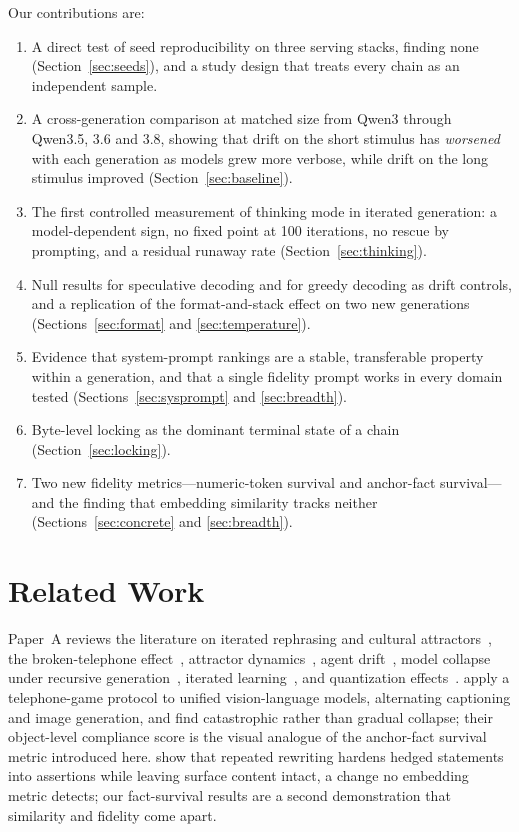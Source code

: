 \documentclass[11pt]{article}
\begin{document}
Our contributions are:
\begin{enumerate}[leftmargin=*]
  \item A direct test of seed reproducibility on three serving stacks,
        finding none (Section~\ref{sec:seeds}), and a study design that
        treats every chain as an independent sample.
  \item A cross-generation comparison at matched size from Qwen3 through
        Qwen3.5, 3.6 and 3.8, showing that drift on the short stimulus has
        \emph{worsened} with each generation as models grew more verbose,
        while drift on the long stimulus improved (Section~\ref{sec:baseline}).
  \item The first controlled measurement of thinking mode in iterated
        generation: a model-dependent sign, no fixed point at 100
        iterations, no rescue by prompting, and a residual runaway rate
        (Section~\ref{sec:thinking}).
  \item Null results for speculative decoding and for greedy decoding as
        drift controls, and a replication of the format-and-stack effect on
        two new generations (Sections~\ref{sec:format} and
        \ref{sec:temperature}).
  \item Evidence that system-prompt rankings are a stable, transferable
        property within a generation, and that a single fidelity prompt
        works in every domain tested (Sections~\ref{sec:sysprompt} and
        \ref{sec:breadth}).
  \item Byte-level locking as the dominant terminal state of a chain
        (Section~\ref{sec:locking}).
  \item Two new fidelity metrics---numeric-token survival and anchor-fact
        survival---and the finding that embedding similarity tracks neither
        (Sections~\ref{sec:concrete} and \ref{sec:breadth}).
\end{enumerate}

\section{Related Work}
\label{sec:related}

Paper~A reviews the literature on iterated rephrasing and cultural
attractors~\citep{perez2025cultural,brinkmann2023machine,acerbi2023content},
the broken-telephone effect~\citep{mohamed2025broken}, attractor
dynamics~\citep{wang2025attractor,chytas2025concept}, agent
drift~\citep{rath2026agent}, model collapse under recursive
generation~\citep{shumailov2024collapse,shumailov2023curse}, iterated
learning~\citep{kirby2008cumulative}, and quantization
effects~\citep{han2026quantization,hooper2024kvquant,liu2024kivi}.
\citet{mollah2025telephone} apply a telephone-game protocol to unified
vision-language models, alternating captioning and image generation, and
find catastrophic rather than gradual collapse; their object-level
compliance score is the visual analogue of the anchor-fact survival metric
introduced here. \citet{belem2026certainty} show that repeated rewriting
hardens hedged statements into assertions while leaving surface content
intact, a change no embedding metric detects; our fact-survival results are
a second demonstration that similarity and fidelity come apart.
\end{document}
